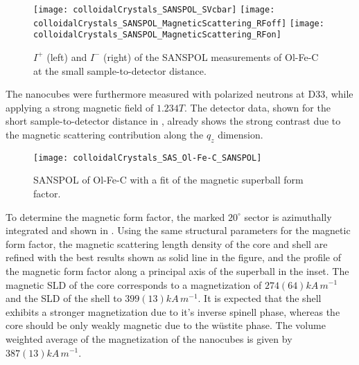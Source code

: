 \documentclass[\main/dresen_thesis.tex]{subfiles}
\begin{document}
    \begin{figure}[tb]
      \centering
      \texttt{[image: colloidalCrystals\_SANSPOL\_SVcbar]}
      \texttt{[image: colloidalCrystals\_SANSPOL\_MagneticScattering\_RFoff]}
      \texttt{[image: colloidalCrystals\_SANSPOL\_MagneticScattering\_RFon]}
      \caption{\label{fig:colloidalCrystals:nanoparticle:sanspolDetectorImage}$I^{+}$ (left) and $I^{-}$ (right) of the SANSPOL measurements of Ol-Fe-C at the small sample-to-detector distance.}
    \end{figure}

    The nanocubes were furthermore measured with polarized neutrons at D33, while applying a strong magnetic field of $1.234 \unit{T}$.
    The detector data, shown for the short sample-to-detector distance in , already shows the strong contrast due to the magnetic scattering contribution along the $q_z$ dimension.

    \begin{figure}[htbp]
      \centering
      \texttt{[image: colloidalCrystals\_SAS\_Ol-Fe-C\_SANSPOL]}
      \caption{\label{fig:colloidalCrystals:nanoparticle:sanspol}SANSPOL of Ol-Fe-C with a fit of the magnetic superball form factor.}
    \end{figure}

    To determine the magnetic form factor, the marked $20 ^\circ$ sector is azimuthally integrated and shown in .
    Using the same structural parameters for the magnetic form factor, the magnetic scattering length density of the core and shell are refined with the best results shown as solid line in the figure, and the profile of the magnetic form factor along a principal axis of the superball in the inset.
    The magnetic SLD of the core corresponds to a magnetization of $274(64) \unit{kA \, m^{-1}}$ and the SLD of the shell to $399(13) \unit{kA \, m^{-1}}$.
    It is expected that the shell exhibits a stronger magnetization due to it's inverse spinell phase, whereas the core should be only weakly magnetic due to the w\"ustite phase.
    The volume weighted average of the magnetization of the nanocubes is given by $387(13) \unit{kA \, m^{-1}}$.
\end{document}
